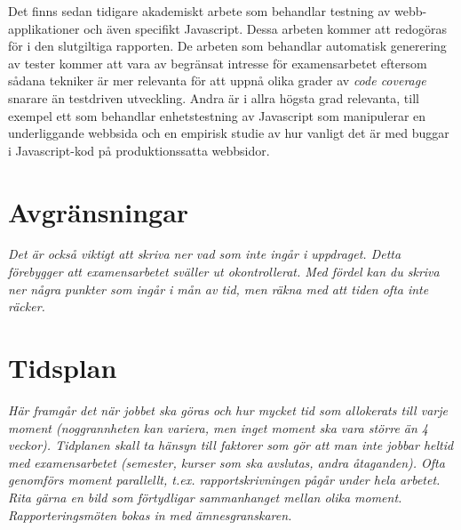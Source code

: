 \documentclass[11pt]{article}
\begin{document}
Det finns sedan tidigare akademiskt arbete som behandlar testning av webb-applikationer och även specifikt Javascript. Dessa arbeten kommer att redogöras för i den slutgiltiga rapporten. De arbeten som behandlar automatisk generering av tester\cite{AutomatedTesting} kommer att vara av begränsat intresse för examensarbetet eftersom sådana tekniker är mer relevanta för att uppnå olika grader av \textit{\foreignlanguage{english}{code coverage}} snarare än testdriven utveckling. Andra är i allra högsta grad relevanta, till exempel ett som behandlar enhetstestning av Javascript som manipulerar en underliggande webbsida\cite{DOMJavascript} och en empirisk studie av hur vanligt det är med buggar i Javascript-kod på produktionssatta webbsidor\cite{Wild}.

\section{Avgränsningar}

\textit{Det är också viktigt att skriva ner vad som inte ingår i uppdraget. Detta förebygger att examensarbetet sväller ut okontrollerat. Med fördel kan du skriva ner några punkter som ingår i mån av tid, men räkna med att tiden ofta inte räcker.}

\section{Tidsplan}

\textit{Här framgår det när jobbet ska göras och hur mycket tid som allokerats till varje moment (noggrannheten kan variera, men inget moment ska vara större än 4 veckor). Tidplanen skall ta hänsyn till faktorer som gör att man inte jobbar heltid med examensarbetet (semester, kurser som ska avslutas, andra åtaganden). Ofta genomförs moment parallellt, t.ex. rapportskrivningen pågår under hela arbetet. Rita gärna en bild som förtydligar sammanhanget mellan olika moment. Rapporteringsmöten bokas in med ämnesgranskaren.}
\end{document}
